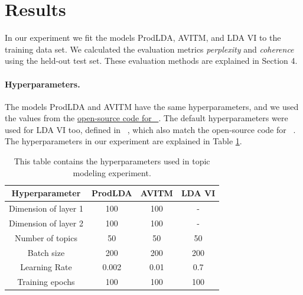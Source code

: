 \documentclass[10pt,twocolumn,letterpaper]{article}
\begin{document}

\section{Results}
\noindent
In our experiment we fit the models ProdLDA, AVITM, and LDA VI to the training data set.
We calculated the evaluation metrics \textit{perplexity} and \textit{coherence} using the held-out test set.
These evaluation methods are explained in Section 4.

\paragraph{Hyperparameters.}
The models ProdLDA and AVITM have the same hyperparameters, and we used the values from the \href{https://github.com/akashgit/autoencoding_vi_for_topic_models}{open-source code for ~\cite{srivastava2017autoencoding}}.
The default hyperparameters were used for LDA VI too, defined in ~\cite{sklearn_api}, which also match the open-source code for ~\cite{srivastava2017autoencoding}.
The hyperparameters in our experiment are explained in Table \ref{tab:1}.

\begin{table}
\centering
\begin{tabular}{ |c|c|c|c| } 
\hline
\textbf{Hyperparameter} & \textbf{ProdLDA} & \textbf{AVITM} & \textbf{LDA VI}\\
\hline
Dimension of layer 1 & 100 & 100 & - \\ 
Dimension of layer 2 & 100 & 100 & - \\ 
Number of topics & 50 & 50 & 50 \\
Batch size & 200 & 200 & 200  \\ 
Learning Rate & 0.002 & 0.01 & 0.7  \\
Training epochs & 100 & 100 & 100 \\
\hline
\end{tabular}
\caption{This table contains the hyperparameters used in topic modeling experiment.}
\label{tab:1}
\end{table}
\end{document}
